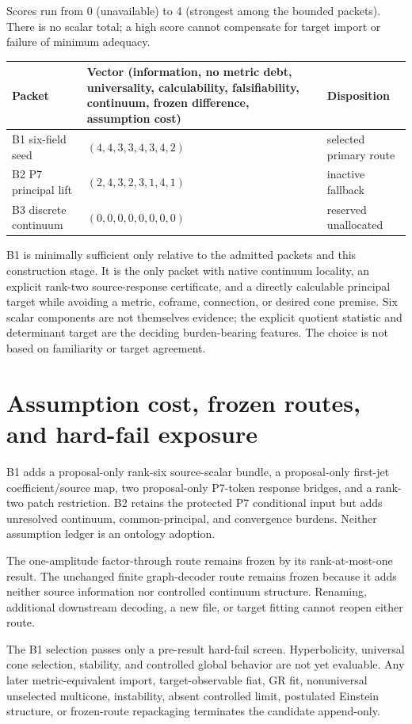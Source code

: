 \documentclass[11pt]{article}
\begin{document}
Scores run from 0 (unavailable) to 4 (strongest among the bounded packets).
There is no scalar total; a high score cannot compensate for target import or
failure of minimum adequacy.

\begin{longtable}{p{}p{}p{}}
\toprule
Packet & Vector (information, no metric debt, universality,
calculability, falsifiability, continuum, frozen difference, assumption cost)
& Disposition\\
\midrule
B1 six-field seed & $(4,4,3,3,4,3,4,2)$ & selected primary route\\
B2 P7 principal lift & $(2,4,3,2,3,1,4,1)$ & inactive fallback\\
B3 discrete continuum & $(0,0,0,0,0,0,0,0)$ & reserved unallocated\\
\bottomrule
\end{longtable}

B1 is minimally sufficient only relative to the admitted packets and this
construction stage. It is the only packet with native continuum locality, an
explicit rank-two source-response certificate, and a directly calculable
principal target while avoiding a metric, coframe, connection, or desired
cone premise. Six scalar components are not themselves evidence; the explicit
quotient statistic and determinant target are the deciding burden-bearing
features. The choice is not based on familiarity or target agreement.

\section{Assumption cost, frozen routes, and hard-fail exposure}

B1 adds a proposal-only rank-six source-scalar bundle, a proposal-only
first-jet coefficient/source map, two proposal-only P7-token response bridges,
and a rank-two patch restriction. B2 retains the protected P7 conditional
input but adds unresolved continuum, common-principal, and convergence burdens.
Neither assumption ledger is an ontology adoption.

The one-amplitude factor-through route remains frozen by its rank-at-most-one
result. The unchanged finite graph-decoder route remains frozen because it
adds neither source information nor controlled continuum structure. Renaming,
additional downstream decoding, a new file, or target fitting cannot reopen
either route.

The B1 selection passes only a pre-result hard-fail screen. Hyperbolicity,
universal cone selection, stability, and controlled global behavior are not
yet evaluable. Any later metric-equivalent import, target-observable fiat, GR
fit, nonuniversal unselected multicone, instability, absent controlled limit,
postulated Einstein structure, or frozen-route repackaging terminates the
candidate append-only.
\end{document}
